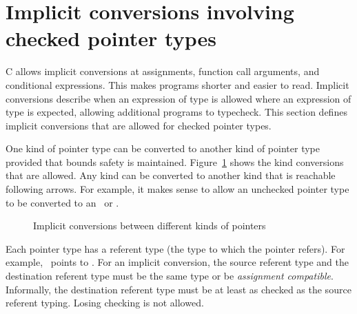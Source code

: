 \section{Implicit conversions involving checked pointer types}
\label{section:implicit-conversions}

C allows implicit conversions at assignments, function call arguments,
and conditional expressions. This makes programs shorter and easier to
read.  Implicit conversions describe when an expression of type
 is allowed where an expression of type  is expected,
allowing additional programs to typecheck.
This section defines implicit conversions that are allowed for checked
pointer types.

One kind of pointer type can be converted to another kind of pointer type provided
that bounds safety is maintained.  Figure~\ref{fig:implicit-type-conversion} shows the
kind conversions that are allowed.  Any kind can be converted to another
kind that is reachable following arrows. For example, it makes sense to allow an unchecked
pointer type to be converted to an \arrayptr\ or \ptr.

\begin{figure}
\begin{center}
\end{center}
\caption{Implicit conversions between different kinds of pointers}
\label{fig:implicit-type-conversion}
\end{figure}

Each pointer type has a referent type (the type to which the pointer refers).
For example, \arrayptrT\ points to .   For an implicit conversion, the
source referent type and the destination referent type must be the same type or
be {\em assignment compatible}.  Informally, the destination referent type must
be at least as checked as the source referent typing.  Losing checking is not allowed.

